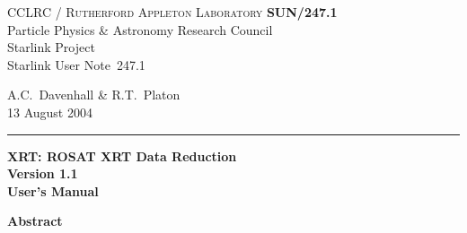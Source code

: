 \documentclass[twoside,11pt]{article}
\newcommand{\stardoccategory}  {Starlink User Note}
\newcommand{\stardocinitials}  {SUN}
\newcommand{\stardocnumber}    {247.1}
\newcommand{\stardocauthors}   {A.C.~Davenhall \& R.T.~Platon}
\newcommand{\stardocdate}      {13 August 2004}
\newcommand{\stardoctitle}     {XRT: %
                                ROSAT XRT Data Reduction}
\newcommand{\stardocversion}   {Version 1.1}
\newcommand{\stardocmanual}    {User's Manual}
\newcommand{\stardocname}{\stardocinitials /\stardocnumber}
\newenvironment{latexonly}{}{}
\renewcommand{\_}{\texttt{\symbol{95}}}
\begin{document}
\thispagestyle{empty}

\begin{latexonly}
   CCLRC / \textsc{Rutherford Appleton Laboratory} \hfill \textbf{\stardocname}\\
   {\large Particle Physics \& Astronomy Research Council}\\
   {\large Starlink Project\\}
   {\large \stardoccategory\ \stardocnumber}
   \begin{flushright}
   \stardocauthors\\
   \stardocdate
   \end{flushright}
   \vspace{-4mm}
   \rule{\textwidth}{0.5mm}
   \vspace{5mm}
   \begin{center}
   {\Huge\textbf{\stardoctitle \\ [2.5ex]}}
   {\LARGE\textbf{\stardocversion \\ [4ex]}}
   {\Huge\textbf{\stardocmanual}}
   \end{center}
   \vspace{5mm}


   \vspace{10mm}
   \begin{center}
      {\Large\textbf{Abstract}}
   \end{center}
\end{latexonly}
\end{document}
